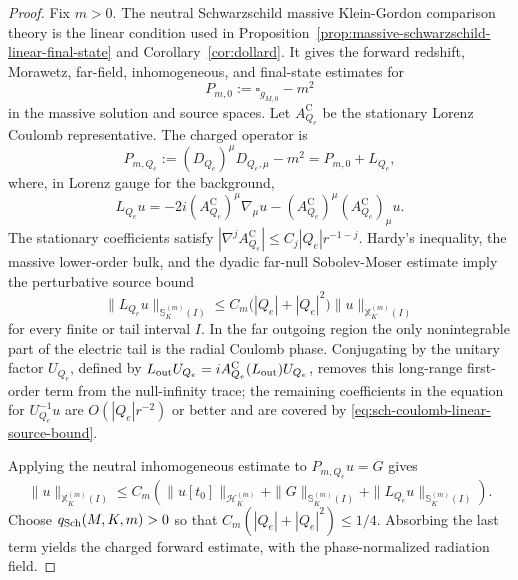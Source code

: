 \documentclass[11pt]{article}
\numberwithin{equation}{section}
\theoremstyle{plain}
\theoremstyle{definition}
\theoremstyle{remark}
\begin{document}
\begin{proof}
Fix \(m>0\).  The neutral Schwarzschild massive Klein-Gordon comparison theory is the linear condition used in Proposition~\ref{prop:massive-schwarzschild-linear-final-state} and Corollary~\ref{cor:dollard}.  It gives the forward redshift, Morawetz, far-field, inhomogeneous, and final-state estimates for
\begin{equation}
 P_{m,0}:=\square_{g_{M,0}}-m^2
\end{equation}
in the massive solution and source spaces.  Let \(A_{Q_e}^{\mathrm C}\) be the stationary Lorenz Coulomb representative.  The charged operator is
\begin{equation}\label{eq:sch-charged-operator-perturb}
 P_{m,Q_e}:=(D_{Q_e})^\mu D_{Q_e,\mu}-m^2
       =P_{m,0}+L_{Q_e},
\end{equation}
where, in Lorenz gauge for the background,
\begin{equation}
 L_{Q_e}u=-2i(A_{Q_e}^{\mathrm C})^\mu\nabla_\mu u
          -(A_{Q_e}^{\mathrm C})^\mu(A_{Q_e}^{\mathrm C})_\mu u.
\end{equation}
The stationary coefficients satisfy \(|\nabla^j A_{Q_e}^{\mathrm C}|\le C_j|Q_e|r^{-1-j}\).  Hardy's inequality, the massive lower-order bulk, and the dyadic far-null Sobolev-Moser estimate imply the perturbative source bound
\begin{equation}\label{eq:sch-coulomb-linear-source-bound}
 \|L_{Q_e}u\|_{\mathbb S_K^{(m)}(I)}
 \le C_m\bigl(|Q_e|+|Q_e|^2\bigr)
       \|u\|_{\mathbb X_K^{(m)}(I)}
\end{equation}
for every finite or tail interval \(I\).  In the far outgoing region the only nonintegrable part of the electric tail is the radial Coulomb phase.  Conjugating by the unitary factor \(U_{Q_e}\), defined by \(L_{\rm out}U_{Q_e}=iA_{Q_e}^{\mathrm C}(L_{\rm out})U_{Q_e}\), removes this long-range first-order term from the null-infinity trace; the remaining coefficients in the equation for \(U_{Q_e}^{-1}u\) are \(O(|Q_e|r^{-2})\) or better and are covered by \eqref{eq:sch-coulomb-linear-source-bound}.

Applying the neutral inhomogeneous estimate to \(P_{m,Q_e}u=G\) gives
\begin{equation}
 \|u\|_{\mathbb X_K^{(m)}(I)}
 \le C_m\left(\|u[t_0]\|_{\mathcal H_K^{(m)}}+
        \|G\|_{\mathbb S_K^{(m)}(I)}+
        \|L_{Q_e}u\|_{\mathbb S_K^{(m)}(I)}\right).
\end{equation}
Choose \(q_{\rm Sch}(M,K,m)>0\) so that \(C_m(|Q_e|+|Q_e|^2)\le1/4\).  Absorbing the last term yields the charged forward estimate, with the phase-normalized radiation field.


\end{proof}
\end{document}
